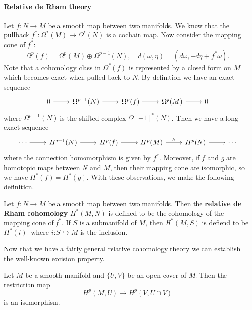 \paragraph{Relative de Rham theory}
Let $f:N\to M$ be a smooth map between two manifolds. We know that the pullback $f^*:\Omega^*(M)\to\Omega^*(N)$ is a cochain map. Now consider the mapping cone of $f^*$:
\[\Omega^p(f)=\Omega^{p}(M)\oplus\Omega^{p-1}(N),\quad d(\omega,\eta)=(d\omega,-d\eta+f^*\omega).\]
Note that a cohomology class in $\Omega^*(f)$ is represented by a closed form on $M$ which becomes exact when pulled back to $N$. By definition we have an exact 
sequence
\[\begin{tikzcd}
0\ar[r]&\Omega^{p-1}(N)\ar[r]&\Omega^p(f)\ar[r]&\Omega^{p}(M)\ar[r]&0
\end{tikzcd}\]
where $\Omega^{p-1}(N)$ is the shifted complex $\Omega[-1]^*(N)$. Then we have a long exact sequence
\[\begin{tikzcd}
\cdots\ar[r]&H^{p-1}(N)\ar[r]&H^p(f)\ar[r]&H^{p}(M)\ar[r,"\delta"]&H^{p}(N)\ar[r]&\cdots
\end{tikzcd}\]
where the connection homomorphism is given by $f^*$. Moreover, if $f$ and $g$ are homotopic maps between $N$ and $M$, then their mapping cone are isomorphic, so we have 
$H^*(f)=H^*(g)$. With these observations, we make the following definition.
\begin{definition}
Let $f:N\to M$ be a smooth map between two manifolds. Then the \textbf{relative de Rham cohomology} $H^*(M,N)$ is defined to be the cohomology of the mapping cone of 
$f^*$. If $S$ is a submanifold of $M$, then $H^*(M,S)$ is defiend to be $H^*(i)$, where $i:S\hookrightarrow M$ is the inclusion.
\end{definition}
Now that we have a fairly general relative cohomology theory we can establish the well-known excision property.
\begin{proposition}
Let $M$ be a smooth manifold and $\{U,V\}$ be an open cover of $M$. Then the restriction map
\[H^p(M,U)\to H^p(V,U\cap V)\]
is an isomorphism.
\end{proposition}
